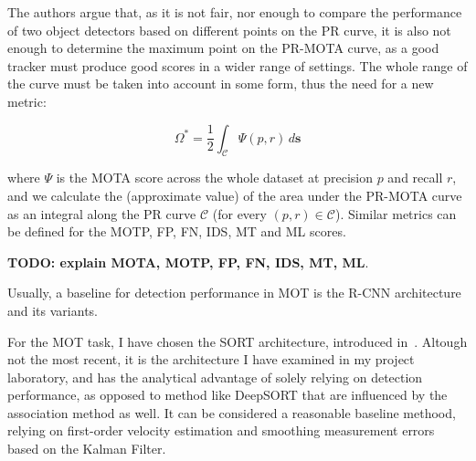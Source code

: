 The authors argue that, as it is not fair, nor enough to compare the performance of two object detectors based on different points on the PR curve, it is also not enough to determine the maximum point on the PR-MOTA curve, as a good tracker must produce good scores in a wider range of settings. The whole range of the curve must be taken into account in some form, thus the need for a new metric:

\[ \Omega^{*} = \frac{1}{2}\int_{\mathcal{C}} \Psi(p, r) \,d\textbf{s} \]

where $\Psi$ is the MOTA score across the whole dataset at precision $p$ and recall $r$, and we calculate the (approximate value) of the area under the PR-MOTA curve as an integral along the PR curve $\mathcal{C}$ (for every $(p, r) \in \mathcal{C}$). Similar metrics can be defined for the MOTP, FP, FN, IDS, MT and ML scores.

\textbf{TODO: explain MOTA, MOTP, FP, FN, IDS, MT, ML}.

Usually, a baseline for detection performance in MOT is the R-CNN architecture and its variants.

For the MOT task, I have chosen the SORT architecture, introduced in~\cite{Bewley_2016}. Altough not the most recent, it is the architecture I have examined in my project laboratory, and has the analytical advantage of solely relying on detection performance, as opposed to method like DeepSORT that are influenced by the association method as well. It can be considered a reasonable baseline methood, relying on first-order velocity estimation and smoothing measurement errors based on the Kalman Filter.  